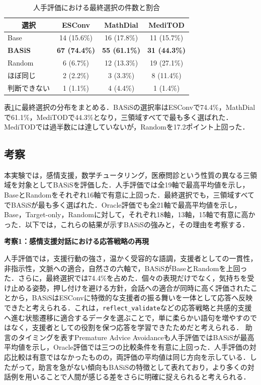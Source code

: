 \documentclass[manuscript,review,anonymous]{acmart}
\begin{document}
\begin{table}[t]
  \centering
  \caption{人手評価における最終選択の件数と割合}
  \label{tab:human_final_choice}
  \small
  \renewcommand{\arraystretch}{1.18}
  \begin{tabular*}{0.68\textwidth}{@{\extracolsep{\fill}}lccc@{}}
    \toprule
    \multicolumn{1}{c}{\textbf{選択}} & \textbf{ESConv} & \textbf{MathDial} & \textbf{MediTOD} \\
    \midrule
    Base       & 14 (15.6\%) & 16 (17.8\%) & 11 (15.7\%) \\
    \textbf{BASiS} & \textbf{67 (74.4\%)} & \textbf{55 (61.1\%)} & \textbf{31 (44.3\%)} \\
    Random     & 6 (6.7\%) & 12 (13.3\%) & 19 (27.1\%) \\
    ほぼ同じ   & 2 (2.2\%) & 3 (3.3\%) & 8 (11.4\%) \\
    判断できない & 1 (1.1\%) & 4 (4.4\%) & 1 (1.4\%) \\
    \bottomrule
  \end{tabular*}
\end{table}

表\ref{tab:human_final_choice}に最終選択の分布をまとめる．BASiSの選択率はESConvで74.4\%，MathDialで61.1\%，MediTODで44.3\%となり，三領域すべてで最も多く選ばれた．MediTODでは過半数には達していないが，Randomを17.2ポイント上回った．
\endgroup

\subsection{考察}
\label{sec:discussion}
\begingroup
\setlength{\emergencystretch}{4em}

本実験では，感情支援，数学チュータリング，医療問診という性質の異なる三領域を対象としてBASiSを評価した．人手評価では全19軸で最高平均値を示し，BaseとRandomをそれぞれ16軸で有意に上回った．最終選択でも，三領域すべてでBASiSが最も多く選ばれた．Oracle評価でも全21軸で最高平均値を示し，Base，Target-only，Randomに対して，それぞれ18軸，13軸，15軸で有意に高かった．以下では，これらの結果が示すBASiSの強みと，その理由を考察する．


\noindent\textbf{考察1：感情支援対話における応答戦略の再現}\par
人手評価では，支援行動の強さ，温かく受容的な語調，支援者としての一貫性，非指示性，文脈への適合，自然さの六軸で，BASiSがBaseとRandomを上回った．さらに，最終選択では74.4\%を占めた．個々の表現だけでなく，気持ちを受け止める姿勢，押し付けを避ける方針，会話への適合が同時に高く評価されたことから，BASiSはESConvに特徴的な支援者の振る舞いを一体として応答へ反映できたと考えられる．これは，\texttt{reflect\_validate}などの応答戦略と共感的支援へ進む状態遷移に適合するデータを選ぶことで，単に柔らかい語句を増やすのではなく，支援者としての役割を保つ応答を学習できたためだと考えられる．
助言のタイミングを表すPremature Advice Avoidanceも人手評価ではBASiSが最高平均値を示し，Oracle評価では三つの比較条件を有意に上回った．人手評価の対応比較は有意ではなかったものの，両評価の平均値は同じ方向を示している．したがって，助言を急がない傾向もBASiSの特徴として表れており，より多くの対話例を用いることで人間が感じる差をさらに明確に捉えられると考えられる．
\end{document}
